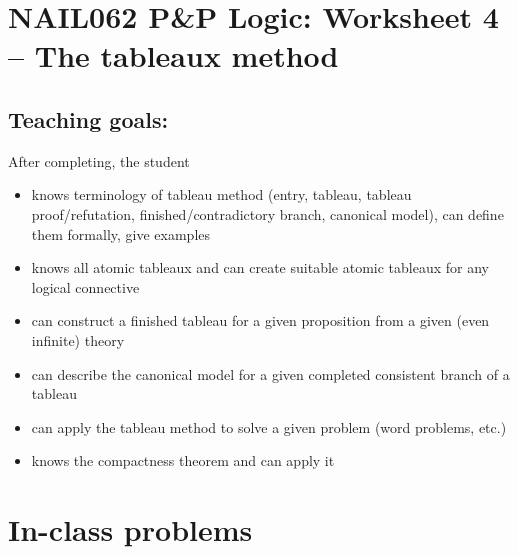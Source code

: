 \section*{NAIL062 P\&P Logic: Worksheet 4 -- The tableaux method}



\subsection*{Teaching goals:} After completing, the student

    \begin{itemize}\setlength{\itemsep}{0pt}
        \item knows terminology of tableau method (entry, tableau, tableau proof/refutation, finished/contradictory branch, canonical model), can define them formally, give examples
        \item knows all atomic tableaux and can create suitable atomic tableaux for any logical connective
        \item can construct a finished tableau for a given proposition from a given (even infinite) theory
        \item can describe the canonical model for a given completed consistent branch of a tableau
        \item can apply the tableau method to solve a given problem (word problems, etc.)
        \item knows the compactness theorem and can apply it
    \end{itemize}

    

\section*{In-class problems}


